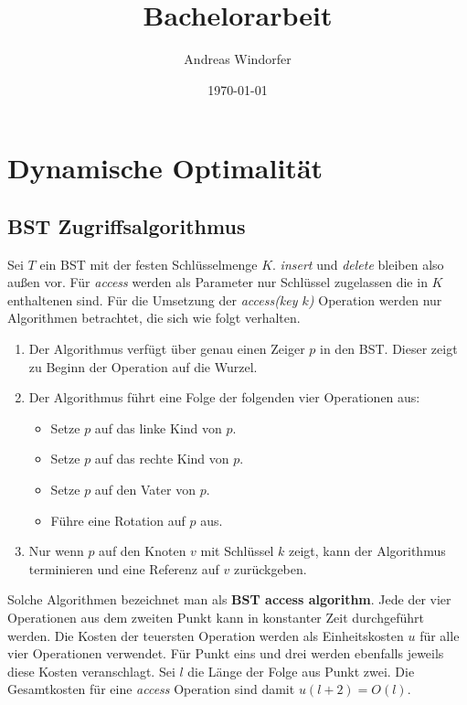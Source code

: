 \documentclass[a4paper,12pt]{article}
\title{Bachelorarbeit}
\author{

	Andreas Windorfer\\
}
\date{\today}
\begin{document}
\maketitle
\newpage

\tableofcontents
\newpage

\section{Dynamische Optimalität}

\subsection{BST Zugriffsalgorithmus }
Sei $T$ ein BST mit der festen Schlüsselmenge $K$. \textit{insert} und \textit{delete} bleiben also außen vor. Für \textit{access} werden als Parameter nur Schlüssel zugelassen die in $K$ enthaltenen sind. Für die Umsetzung der \textit{access(key $k$)} Operation  werden nur Algorithmen betrachtet, die sich wie folgt verhalten. 
\begin{enumerate} 
	\item Der Algorithmus verfügt über genau einen Zeiger $p$ in den BST. Dieser zeigt zu Beginn der Operation auf die Wurzel.  
	\item Der Algorithmus führt eine Folge der folgenden vier Operationen aus:
	\begin{itemize}
		\item Setze $p$ auf das linke Kind von $p$.
		\item Setze $p$ auf das rechte Kind von $p$.
		\item Setze $p$ auf den Vater von $p$.
		\item Führe eine Rotation auf $p$ aus.
	\end{itemize}  
	\item Nur wenn $p$ auf den Knoten $v$ mit Schlüssel $k$ zeigt, kann der Algorithmus terminieren und eine Referenz auf $v$ zurückgeben. 
\end{enumerate}
Solche Algorithmen bezeichnet man als \textbf{BST access algorithm}.
Jede der vier Operationen aus dem zweiten Punkt kann in konstanter Zeit durchgeführt werden. Die Kosten der teuersten Operation werden als Einheitskosten $u$ für alle vier Operationen verwendet. Für Punkt eins und drei werden ebenfalls jeweils diese Kosten veranschlagt. Sei $l$ die Länge der Folge aus Punkt zwei. Die Gesamtkosten für eine \textit{access} Operation sind damit $u \left(l + 2 \right) = O\left( l\right)$. 
  




\newpage


\end{document}
